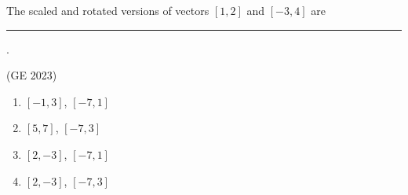     \item The scaled and rotated versions of vectors $[1, 2]$ and $[-3, 4]$ are \rule{3cm}{0.15mm}.

\hfill	    (GE 2023)
\begin{multicols}{4}
	    \begin{enumerate}
		    \item  $[-1, 3]$, $[-7,1]$ 
		    \item  $[5, 7]$, $[-7, 3]$ 
		    \item  $[2, -3]$, $[-7, 1]$
		    \item  $[2, -3]$, $[-7, 3]$
\end{enumerate}
\end{multicols}
